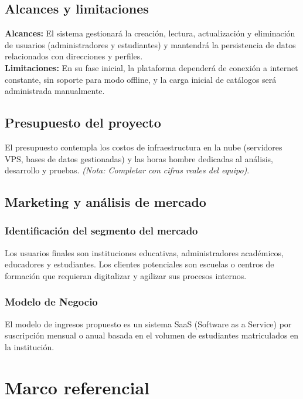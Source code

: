\documentclass[12pt, a4paper]{article}
\begin{document}
\subsection{Alcances y limitaciones}
\textbf{Alcances:} El sistema gestionará la creación, lectura, actualización y eliminación de usuarios (administradores y estudiantes) y mantendrá la persistencia de datos relacionados con direcciones y perfiles. \\
\textbf{Limitaciones:} En su fase inicial, la plataforma dependerá de conexión a internet constante, sin soporte para modo offline, y la carga inicial de catálogos será administrada manualmente.

\subsection{Presupuesto del proyecto}
El presupuesto contempla los costos de infraestructura en la nube (servidores VPS, bases de datos gestionadas) y las horas hombre dedicadas al análisis, desarrollo y pruebas. \textit{(Nota: Completar con cifras reales del equipo)}.

\subsection{Marketing y análisis de mercado}
\subsubsection{Identificación del segmento del mercado}
Los usuarios finales son instituciones educativas, administradores académicos, educadores y estudiantes. Los clientes potenciales son escuelas o centros de formación que requieran digitalizar y agilizar sus procesos internos.

\subsubsection{Modelo de Negocio}
El modelo de ingresos propuesto es un sistema SaaS (Software as a Service) por suscripción mensual o anual basada en el volumen de estudiantes matriculados en la institución.

\section{Marco referencial}
\end{document}
